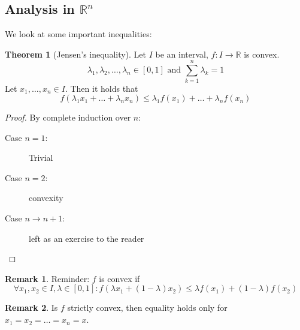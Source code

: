 \documentclass[a4paper,landscape,twocolumn]{article}
\theoremstyle{definition}
\newtheorem{theorem}{Theorem}
\newtheorem{rem}{Remark}
\begin{document}
\subsection{Analysis in $\mathbb R^n$}
%
We look at some important inequalities:
%
\begin{theorem}[Jensen's inequality]
  Let $I$ be an interval, $f: I \to \mathbb R$ is convex.
  \[ \lambda_1, \lambda_2, \ldots, \lambda_n \in [0,1] \text{ and } \sum_{k=1}^{n} \lambda_k = 1 \]
  Let $x_1, \ldots, x_n \in I$. Then it holds that
  \[ f(\lambda_1 x_1 + \ldots + \lambda_n x_n) \leq \lambda_1 f(x_1) + \ldots + \lambda_n f(x_n) \]
\end{theorem}
\begin{proof}
  By complete induction over $n$:
  \begin{description}
    \item[Case $n=1$:] Trivial
    \item[Case $n=2$:] convexity
    \item[Case $n\to n+1$:] left as an exercise to the reader
  \end{description}
\end{proof}
\begin{rem}
  Reminder: $f$ is convex if
  \[
    \forall x_1, x_2 \in I, \lambda \in [0,1]:
    f(\lambda x_1 + (1 - \lambda) x_2) \leq \lambda f(x_1) + (1  - \lambda) f(x_2)
  \]
\end{rem}
\begin{rem}
  Is $f$ strictly convex, then equality holds only for $x_1 = x_2 = \ldots = x_n = x$.
\end{rem}
\end{document}
